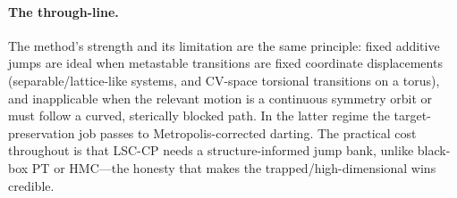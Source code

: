 \paragraph{The through-line.} The method's strength and its limitation are the same principle: fixed
additive jumps are ideal when metastable transitions are fixed coordinate displacements
(separable/lattice-like systems, and CV-space torsional transitions on a torus), and inapplicable
when the relevant motion is a continuous symmetry orbit or must follow a curved, sterically blocked
path. In the latter regime the target-preservation job passes to Metropolis-corrected darting. The
practical cost throughout is that LSC-CP needs a structure-informed jump bank, unlike black-box PT or
HMC---the honesty that makes the trapped/high-dimensional wins credible.
